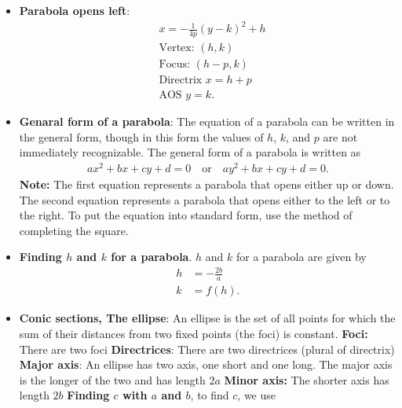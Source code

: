 \documentclass{report}
\begin{document}
\begin{itemize}
    \item \textbf{Parabola opens left}:
        \begin{align*}
            &x= -\frac{1}{4p}(y-k)^{2} + h \\
            &\text{Vertex: } (h,k) \\
            &\text{Focus: } (h-p,k) \\
            &\text{Directrix } x=h+p \\
            &\text{AOS } y=k
        .\end{align*}
        \bigbreak \noindent 
    \item \textbf{Genaral form of a parabola}:
        The equation of a parabola can be written in the general form, though in this form the values of $h$, $k$, and $p$ are not immediately recognizable. The general form of a parabola is written as
        \begin{align*}
             ax^2 + bx + cy + d = 0 \quad \text{or} \quad ay^2 + bx + cy + d = 0
        .\end{align*}
        \textbf{Note:} The first equation represents a parabola that opens either up or down. The second equation represents a parabola that opens either to the left or to the right. To put the equation into standard form, use the method of completing the square.
    \item \textbf{Finding $h$ and $k$ for a parabola}. $h$ and $k$ for a parabola are given by
        \begin{align*}
            h &= -\frac{2b}{a} \\
            k &= f(h)
        .\end{align*}
    \item \textbf{Conic sections, The ellipse}:
        An ellipse is the set of all points for which the sum of their distances from two fixed points (the foci) is constant.
        \bigbreak \noindent 
        \bigbreak \noindent 
        \textbf{Foci:} There are two foci
        \smallbreak \noindent
        \textbf{Directrices}: There are two directrices (plural of directrix)
        \smallbreak \noindent
        \textbf{Major axis}: An ellipse has two axis, one short and one long. The major axis is the longer of the two and has length $2a$
        \smallbreak \noindent
        \textbf{Minor axis:} The shorter axis has length $2b$
        \smallbreak \noindent
        \textbf{Finding $c$ with $a$ and $b$}, to find $c$, we use
        \begin{align*}

\end{align*}
\end{itemize}
\end{document}
